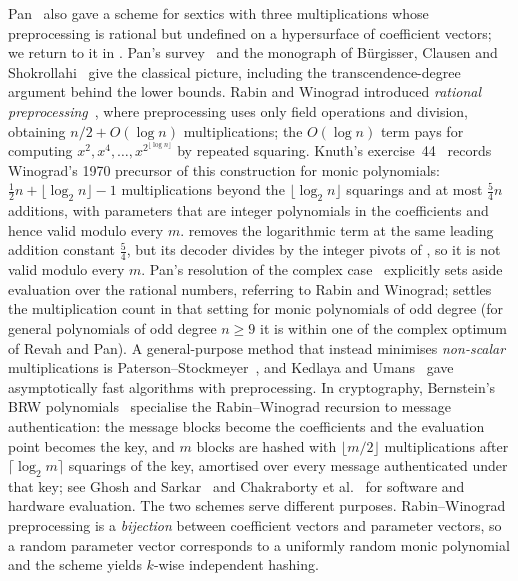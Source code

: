 Pan~\cite{pan1961schemes} also gave a scheme for sextics with three multiplications whose preprocessing is rational but undefined on a hypersurface of coefficient vectors; we return to it in .
Pan's survey~\cite{pan1966methods} and the monograph of B\"urgisser, Clausen and Shokrollahi~\cite[Chapter~5]{burgisser1997algebraic} give the classical picture, including the transcendence-degree argument behind the lower bounds.
Rabin and Winograd introduced \emph{rational preprocessing}~\cite{rabin1972number}, where preprocessing uses only field operations and division, obtaining $n/2+O(\log n)$ multiplications; the $O(\log n)$ term pays for computing $x^2,x^4,\ldots,x^{2^{\lfloor\log n\rfloor}}$ by repeated squaring.
Knuth's exercise~44~\cite[\S4.6.4]{knuth1997seminumerical} records Winograd's 1970 precursor of this construction for monic polynomials: $\frac12n+\lfloor\log_2 n\rfloor-1$ multiplications beyond the $\lfloor\log_2 n\rfloor$ squarings and at most $\frac54n$ additions, with parameters that are integer polynomials in the coefficients and hence valid modulo every $m$.
 removes the logarithmic term at the same leading addition constant $\frac54$, but its decoder divides by the integer pivots of , so it is not valid modulo every $m$.
Pan's resolution of the complex case~\cite{pan1978complex} explicitly sets aside evaluation over the rational numbers, referring to Rabin and Winograd;  settles the multiplication count in that setting for monic polynomials of odd degree (for general polynomials of odd degree $n\ge9$ it is within one of the complex optimum of Revah and Pan).
A general-purpose method that instead minimises \emph{non-scalar} multiplications is Paterson--Stockmeyer~\cite{paterson1973evaluation}, and Kedlaya and Umans~\cite{kedlaya2011fast} gave asymptotically fast algorithms with preprocessing.
In cryptography, Bernstein's BRW polynomials~\cite{Bernstein:2011:RW} specialise the Rabin--Winograd recursion to message authentication: the message blocks become the coefficients and the evaluation point becomes the key, and $m$ blocks are hashed with $\lfloor m/2\rfloor$ multiplications after $\lceil\log_2 m\rceil$ squarings of the key, amortised over every message authenticated under that key; see Ghosh and Sarkar~\cite{ghosh2019evaluating} and Chakraborty et al.~\cite{chakrabortyefficient} for software and hardware evaluation.
The two schemes serve different purposes.
Rabin--Winograd preprocessing is a \emph{bijection} between coefficient vectors and parameter vectors, so a random parameter vector corresponds to a uniformly random monic polynomial and the scheme yields $k$-wise independent hashing.
